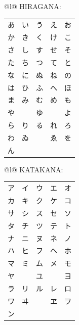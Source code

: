 \documentclass[crop=false,preview=false]{standalone}
\begin{document}
\noindent
\begin{minipage}[c][\textheight][c]{\textwidth}
\centering
\begin{tabular}[t]{@{}l@{}}
{\regular \scriptsize HIRAGANA:}\\
{\jp
\begin{tabular}{@{}lllll@{}}
あ & い & う & え & お \\
か & き & く & け & こ \\
さ & し & す & せ & そ \\
た & ち & つ & て & と \\
な & に & ぬ & ね & の \\
は & ひ & ふ & へ & ほ \\
ま & み & む & め & も \\
や &   & ゆ &   & よ \\
ら & り & る & れ & ろ \\
わ & ゐ &   & ゑ & を \\
ん &   &   &   &
\end{tabular}}
\end{tabular}%
\hspace{1.5cm}%
\begin{tabular}[t]{@{}l@{}}
{\regular \scriptsize KATAKANA:}\\
{\jp
\begin{tabular}{@{}lllll@{}}
ア & イ & ウ & エ & オ \\
カ & キ & ク & ケ & コ \\
サ & シ & ス & セ & ソ \\
タ & チ & ツ & テ & ト \\
ナ & ニ & ヌ & ネ & ノ \\
ハ & ヒ & フ & ヘ & ホ \\
マ & ミ & ム & メ & モ \\
ヤ &   & ユ &   & ヨ \\
ラ & リ & ル & レ & ロ \\
ワ & ヰ &   & ヱ & ヲ \\
ン &   &   &   &
\end{tabular}}
\end{tabular}
\end{minipage}
\end{document}
